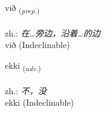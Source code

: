 \documentclass[frontgrid, backgrid]{flacards}\usepackage[]{graphicx}\usepackage[]{xcolor}
\begin{document}

\renewcommand{\flhead}{\vskip5pt \fboxsep=0pt {\small\bfseries\footnotesize Forsetning | 介词}}
\renewcommand{\fcfoot}{\vskip5pt \fboxsep=0pt \hspace{2pt}{\small\bfseries\footnotesize 1K}}

\renewcommand{\blhead}{\vskip5pt {\small\bfseries\footnotesize Forsetning | 介词 }}
\renewcommand{\bcfoot}{\vskip5pt \hspace{2pt}{\small\bfseries\footnotesize 1K}}


{við \small{\textsubscript{(\textit{prep.})}} \\[1ex]
\textphonetic{[vɪːð]} \\
zh.: \emph{在…旁边，沿着…的边} \\  [2ex]
við (Indeclinable)}


\renewcommand{\flhead}{\vskip5pt \fboxsep=0pt {\small\bfseries\footnotesize Atviksorð | 副词}}
\renewcommand{\fcfoot}{\vskip5pt \fboxsep=0pt \hspace{2pt}{\small\bfseries\footnotesize 1K}}

\renewcommand{\blhead}{\vskip5pt {\small\bfseries\footnotesize Atviksorð | 副词 }}
\renewcommand{\bcfoot}{\vskip5pt \hspace{2pt}{\small\bfseries\footnotesize 1K}}


{ekki \small{\textsubscript{(\textit{adv.})}} \\[1ex]
\textphonetic{[ɛhcɪ]} \\
zh.: \emph{不，没} \\  [2ex]
ekki (Indeclinable)}

\renewcommand{\flhead}{\vskip5pt \fboxsep=0pt {\small\bfseries\footnotesize Fornafn | 代词}}
\renewcommand{\fcfoot}{\vskip5pt \fboxsep=0pt \hspace{2pt}{\small\bfseries\footnotesize 1K}}

\renewcommand{\blhead}{\vskip5pt {\small\bfseries\footnotesize Fornafn | 代词 }}
\renewcommand{\bcfoot}{\vskip5pt \hspace{2pt}{\small\bfseries\footnotesize 1K}}
\end{document}
